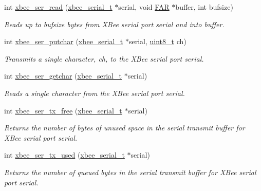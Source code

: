 \begin{DoxyCompactItemize}
int \hyperlink{group__hal__rabbit_ga8263312373c03a79a718142e051b3342}{xbee\+\_\+ser\+\_\+read} (\hyperlink{structxbee__serial__t}{xbee\+\_\+serial\+\_\+t} $\ast$serial, void \hyperlink{group__hal_gaef060b3456fdcc093a7210a762d5f2ed}{F\+AR} $\ast$buffer, int bufsize)
\begin{DoxyCompactList}\small\item\em Reads up to {\itshape bufsize} bytes from X\+Bee serial port {\itshape serial} and into {\itshape buffer}. \end{DoxyCompactList}\item 
int \hyperlink{group__hal__rabbit_ga86fea2345efb8bf9424228f0979b1849}{xbee\+\_\+ser\+\_\+putchar} (\hyperlink{structxbee__serial__t}{xbee\+\_\+serial\+\_\+t} $\ast$serial, \hyperlink{group__hal__dos_gae1affc9ca37cfb624959c866a73f83c2}{uint8\+\_\+t} ch)
\begin{DoxyCompactList}\small\item\em Transmits a single character, {\itshape ch}, to the X\+Bee serial port {\itshape serial}. \end{DoxyCompactList}\item 
int \hyperlink{group__hal__rabbit_gaeeb38154313a44f86146cdcfe08e7d08}{xbee\+\_\+ser\+\_\+getchar} (\hyperlink{structxbee__serial__t}{xbee\+\_\+serial\+\_\+t} $\ast$serial)
\begin{DoxyCompactList}\small\item\em Reads a single character from the X\+Bee serial port {\itshape serial}. \end{DoxyCompactList}\item 
int \hyperlink{group__hal__rabbit_ga3ad8f378b572d6fec982f1086bd3b94f}{xbee\+\_\+ser\+\_\+tx\+\_\+free} (\hyperlink{structxbee__serial__t}{xbee\+\_\+serial\+\_\+t} $\ast$serial)
\begin{DoxyCompactList}\small\item\em Returns the number of bytes of unused space in the serial transmit buffer for X\+Bee serial port {\itshape serial}. \end{DoxyCompactList}\item 
int \hyperlink{group__hal__rabbit_gaabf70934d186354cde4ac14ed27d1bd2}{xbee\+\_\+ser\+\_\+tx\+\_\+used} (\hyperlink{structxbee__serial__t}{xbee\+\_\+serial\+\_\+t} $\ast$serial)
\begin{DoxyCompactList}\small\item\em Returns the number of queued bytes in the serial transmit buffer for X\+Bee serial port {\itshape serial}. \end{DoxyCompactList}\item 

\end{DoxyCompactItemize}
